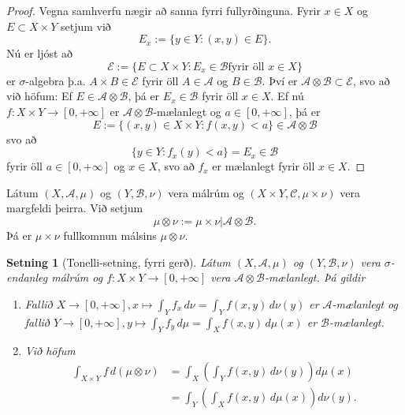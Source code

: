 \documentclass[a4paper,icelandic,11pt]{book}
\theoremstyle{plain}      \newtheorem{setn}{Setning}[chapter]
\theoremstyle{definition} \newtheorem{skilgr}[setn]{Skilgreining}
\theoremstyle{remark}     \newtheorem*{ath}{Athugasemd}
\begin{document}
\begin{proof}
  Vegna samhverfu nægir að sanna fyrri fullyrðinguna. Fyrir $x\in X$
  og $E\subset X\times Y$ setjum við
  \[
  E_{x} := \{ y\in Y : (x,y)\in E \}.
  \]
  Nú er ljóst að 
  \[
  \mathcal E := \{ E\subset X\times Y : E_{x} \in\mathcal B\text{
    fyrir öll }x\in X \}
  \]
  er $\sigma$-algebra þ.a. $A\times B\in\mathcal E$ fyrir öll
  $A\in\mathcal A$ og $B\in\mathcal B$. Því er $\mathcal
  A\otimes\mathcal B\subset\mathcal E$, svo að við höfum: Ef
  $E\in\mathcal A\otimes\mathcal B$, þá er $E_{x}\in\mathcal B$ fyrir
  öll $x\in X$. Ef nú $f:X\times Y\to[0,+\infty]$ er $\mathcal
  A\otimes\mathcal B$-mælanlegt og $a\in[0,+\infty]$, þá er 
  \[
  E := \{ (x,y)\in X\times Y : f(x,y) < a \}
  \in\mathcal A\otimes\mathcal B
  \]
  svo að 
  \[
  \{ y\in Y : f_{x}(y) < a \}
  = E_{x} \in\mathcal B
  \]
  fyrir öll $a\in [0,+\infty]$ og $x\in X$, svo að $f_{x}$ er
  mælanlegt fyrir öll $x\in X$.
\end{proof}
Látum $(X,\mathcal A,\mu)$ og $(Y,\mathcal B, \nu)$ vera málrúm og
$(X\times Y,\mathcal C, \mu\times\nu)$ vera margfeldi þeirra. Við
setjum
\[
\mu\otimes\nu := \mu\times\nu|\mathcal A\otimes\mathcal B.
\]
Þá er $\mu\times\nu$ fullkomnun málsins $\mu\otimes\nu$. 
\begin{setn}[Tonelli-setning, fyrri gerð]
  Látum $(X,\mathcal A,\mu)$ og $(Y,\mathcal B,\nu)$ vera
  $\sigma$-endanleg málrúm og $f:X\times Y\to[0,+\infty]$ vera
  $\mathcal A\otimes \mathcal B$-mælanlegt. Þá gildir
  \begin{enumerate}[(1)]
  \item Fallið $X\to[0,+\infty],x\mapsto\int_{Y}f_{x}\,d\nu =
    \int_{Y}f(x,y)\,d\nu(y)$ er $\mathcal A$-mælanlegt og fallið
    $Y\to[0,+\infty], y\mapsto\int_{Y}f_{y}\,d\mu =
    \int_{X}f(x,y)\,d\mu(x)$ er $\mathcal B$-mælanlegt.
  \item Við höfum
    \begin{align*}
      \int_{X\times Y}f\,d(\mu\otimes\nu)
      &= \int_{X}\left(\int_{Y}f(x,y)\,d\nu(y)\right)d\mu(x)
      \\
      &= \int_{Y}\left(\int_{X}f(x,y)\,d\mu(x)\right)d\nu(y).
    \end{align*}
  \end{enumerate}
\end{setn}
\end{document}
